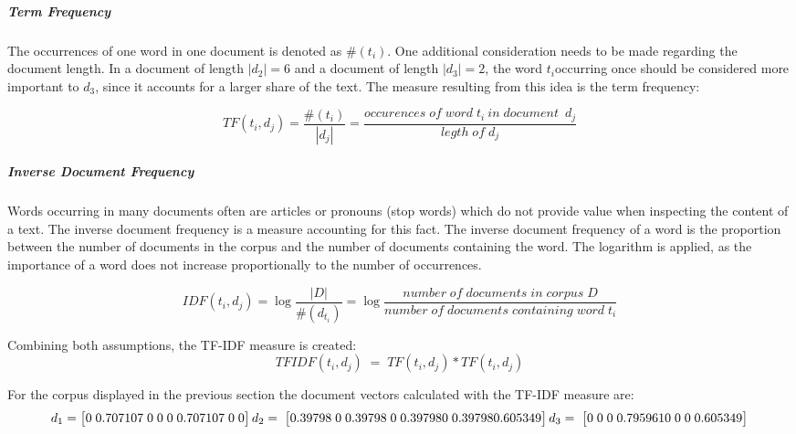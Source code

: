             \subparagraph{Term Frequency}
            The occurrences of one word in one document is denoted as $ \#( t_{i}) $.
            One additional consideration needs to be made regarding the document length. In a document of length $ |d_{2}| = 6 $ and a document of length  $ |d_{3}| = 2 $, the word $ t_{i} $occurring once should be considered more important to $ d_{3} $, since it accounts for a larger share of the text. The measure resulting from this idea is the term frequency:
            
            \[ TF(t_{i}, d_{j}) =   \dfrac{\#( t_{i})}{|d_{j}|} = \dfrac{occurences \; of \; word \; t_{i} \: in \; document \;\:   d_{j}}{legth \; of \; d_{j}} \]
            
            \subparagraph{Inverse Document Frequency}
            Words occurring in many documents often are articles or pronouns (stop words) which do not provide value when inspecting the content of a text. The inverse document frequency is a measure accounting for this fact. The inverse document frequency of a word is the proportion between the number of documents in the corpus and the number of documents containing the word. The logarithm is applied, as the importance of a word does not increase proportionally to the number of occurrences.
        
            \[ IDF(t_{i}, d_{j}) = \log \dfrac{|D|}{\#(d_{t_{i}}) } =  \log \dfrac{number \;  of\;  documents \;  in \; corpus \; D}{ number \; of \; documents \; containing \; word \; t_{i}} \]
            
            Combining both assumptions, the \ac{TF-IDF} measure is created:
             \[ TFIDF(t_{i}, d_{j}) \;=\; TF(t_{i}, d_{j}) * TF(t_{i}, d_{j})\]
            
            For the corpus displayed in the previous section the document vectors calculated with the \ac{TF-IDF} measure are:
                \[d_1 = \begin{bmatrix} 0\;	0.707107\;	0\;	0\;	0\;	0.707107\;	0\;	0 \end{bmatrix}	 \\
                d_2 =  \;\begin{bmatrix} 0.39798\;	0\;	0.39798\;	0\;	0.39798	0\;	0.39798	0.605349 \end{bmatrix} \\
                d_3 = \;\begin{bmatrix} 0\;	0\;	0\;	0.795961	0\;	0\;	0\;	0.605349 \end{bmatrix} \]
                
